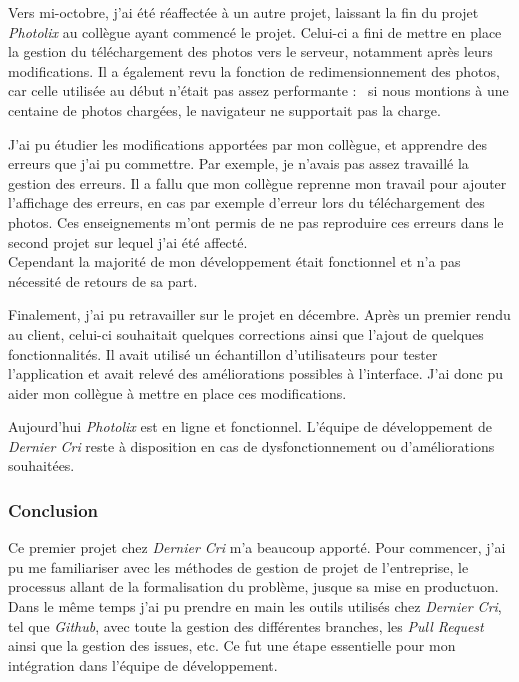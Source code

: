 \bigskip

Vers mi-octobre, j'ai été réaffectée à un autre projet, laissant la fin
du projet \emph{Photolix} au collègue ayant commencé le projet. Celui-ci
a fini de mettre en place la gestion du téléchargement des photos vers
le serveur, notamment après leurs modifications. Il a également revu la
fonction de redimensionnement des photos, car celle utilisée au début
n'était pas assez performante : ~si nous montions à une centaine de
photos chargées, le navigateur ne supportait pas la charge.

\bigskip

J'ai pu étudier les modifications apportées par mon collègue, et
apprendre des erreurs que j'ai pu commettre. Par exemple, je n'avais pas
assez travaillé la gestion des erreurs. Il a fallu que mon collègue
reprenne mon travail pour ajouter l'affichage des erreurs, en cas par
exemple d'erreur lors du téléchargement des photos. Ces enseignements
m'ont permis de ne pas reproduire ces erreurs dans le second projet sur
lequel j'ai été affecté.\\
Cependant la majorité de mon développement était fonctionnel et n'a pas
nécessité de retours de sa part.

\bigskip

Finalement, j'ai pu retravailler sur le projet en décembre. Après un
premier rendu au client, celui-ci souhaitait quelques corrections ainsi
que l'ajout de quelques fonctionnalités. Il avait utilisé un échantillon
d'utilisateurs pour tester l'application et avait relevé des
améliorations possibles à l'interface. J'ai donc pu aider mon collègue à
mettre en place ces modifications.

\bigskip

Aujourd'hui \emph{Photolix} est en ligne et fonctionnel. L'équipe de
développement de \emph{Dernier Cri} reste à disposition en cas de
dysfonctionnement ou d'améliorations souhaitées.

\subsubsection{Conclusion}\label{conclusion}

\bigskip

Ce premier projet chez \emph{Dernier Cri} m'a beaucoup apporté. Pour
commencer, j'ai pu me familiariser avec les méthodes de gestion de
projet de l'entreprise, le processus allant de la formalisation du
problème, jusque sa mise en productuon. Dans le même temps j'ai pu
prendre en main les outils utilisés chez \emph{Dernier Cri}, tel que
\emph{Github}, avec toute la gestion des différentes branches, les
\emph{Pull Request} ainsi que la gestion des issues, etc. Ce fut une
étape essentielle pour mon intégration dans l'équipe de développement.

